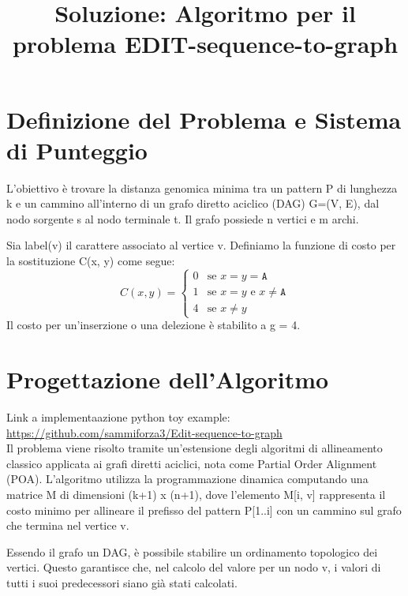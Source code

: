 \documentclass[11pt, a4paper]{article}
\title{Soluzione: Algoritmo per il problema EDIT-sequence-to-graph}
\author{}
\date{}
\begin{document}
\maketitle

\section{Definizione del Problema e Sistema di Punteggio}
L'obiettivo è trovare la distanza genomica minima tra un pattern P di lunghezza k e un cammino all'interno di un grafo diretto aciclico (DAG) G=(V, E), dal nodo sorgente s al nodo terminale t. Il grafo possiede n vertici e m archi.

Sia label(v) il carattere associato al vertice v. Definiamo la funzione di costo per la sostituzione C(x, y) come segue:
\begin{equation}
C(x, y) =
\begin{cases}
0 & \text{se } x = y = \mathtt{A} \\
1 & \text{se } x = y \text{ e } x \neq \mathtt{A} \\
4 & \text{se } x \neq y
\end{cases}
\end{equation}
Il costo per un'inserzione o una delezione è stabilito a g = 4.

\section{Progettazione dell'Algoritmo}

Link a implementaazione python toy example: \\
\url{https://github.com/sammiforza3/Edit-sequence-to-graph}
\\
Il problema viene risolto tramite un'estensione degli algoritmi di allineamento classico applicata ai grafi diretti aciclici, nota come Partial Order Alignment (POA). 
L'algoritmo utilizza la programmazione dinamica computando una matrice M di dimensioni (k+1) x (n+1), dove l'elemento M[i, v] rappresenta il costo minimo per allineare il prefisso del pattern P[1..i] con un cammino sul grafo che termina nel vertice v.

Essendo il grafo un DAG, è possibile stabilire un ordinamento topologico dei vertici. Questo garantisce che, nel calcolo del valore per un nodo v, i valori di tutti i suoi predecessori siano già stati calcolati.
\end{document}
